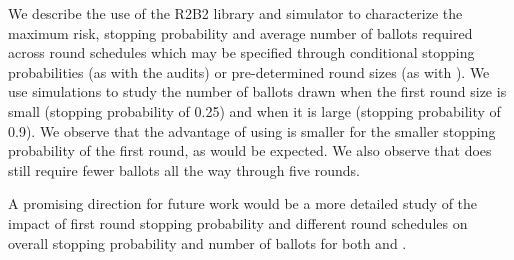 We describe the use of the R2B2 library and simulator to characterize the maximum risk, stopping probability and average number of ballots required across round schedules which may be specified through conditional stopping probabilities (as with the \BRAVO audits) or pre-determined round sizes (as with \Minerva). We use simulations to study the number of ballots drawn when the first round size is small (stopping probability of 0.25) and when it is large (stopping probability of 0.9). We observe that the advantage of using \Minerva is smaller for the smaller stopping probability of the first round, as would be expected. We also observe that \Minerva does still require fewer ballots all the way through five rounds.  

A promising direction for future work would be a more detailed study of the impact of first round stopping probability and different round schedules on overall stopping probability and number of ballots for both \Minerva and \BRAVO. 